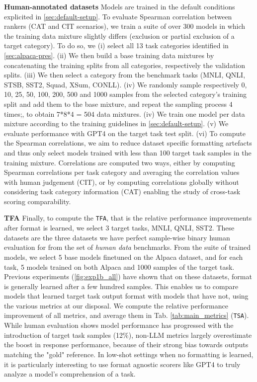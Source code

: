 \textbf{Human-annotated datasets} Models are trained in the default conditions explicited in \ref{sec:default-setup}. To evaluate Spearman correlation between rankers (CAT and CIT scenarios), we train a suite of over 300 models in which the training data mixture slightly differs (exclusion or partial exclusion of a target category). To do so, we (i) select all 13 task categories identified in \ref{sec:alpaca-pres}. (ii) We then build a base training data mixtures by concatenating the training splits from all categories, respectively the validation splits. (iii) We then select a category from the benchmark tasks (MNLI, QNLI, STSB, SST2, Squad, XSum, CONLL). (iv) We randomly sample respectively 0, 10, 25, 50, 100, 200, 500 and 1000 samples from the selected category's training split and add them to the base mixture, and repeat the sampling process 4 times;, to obtain 7*8*4 = 504 data mixtures. (iv) We train one model per data mixture according to the training guidelines in \ref{sec:default-setup}. (v) We evaluate performance with GPT4 on the target task test split. (vi) To compute the Spearman correlations, we aim to reduce dataset specific formatting artefacts and thus only select models trained with less than 100 target task samples in the training mixture. Correlations are computed two ways, either by computing Spearman correlations per task category and averaging the correlation values with human judgement (CIT), or by computing correlations globally without considering task category information (CAT) enabling the study of cross-task scoring comparability. 

\textbf{TFA}
Finally, to compute the \texttt{TFA}, that is the relative performance improvements after format is learned, we select 3 target tasks, MNLI, QNLI, SST2. These datasets are the three datasets we have perfect sample-wise binary human evaluation for from the set of \emph{human data} benchmarks. From the suite of trained models, we select 5 base models finetuned on the Alpaca dataset, and for each task, 5 models trained on both Alpaca and 1000 samples of the target task. Previous experiments (\autoref{fig:exp1b_all}) have shown that on these datasets, format is generally learned after a few hundred samples. This enables us to compare models that learned target task output format with models that have not, using the various metrics at our disposal. We compute the relative performance improvement of all metrics, and average them in Tab. \ref{tab:main_metrics} (\texttt{TSA}). While human evaluation shows model performance has progressed with the introduction of target task samples (12\%), non-LLM metrics largely overestimate the boost in response performance, because of their strong bias towards outputs matching the "gold" reference. In low-shot settings when no formatting is learned, it is particularly interesting to use format agnostic scorers like GPT4 to truly analyze a model's comprehension of a task.

